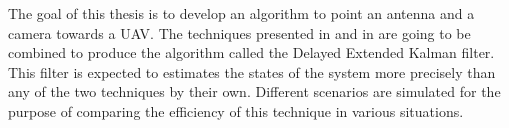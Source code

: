 %
%
%

\begin{publicabstract}

The goal of this thesis is to develop an algorithm to point an antenna and a camera towards a UAV. The techniques presented in \cite{Larsen1998} and in \cite{Beard2010a} are going to be combined to produce the algorithm called the Delayed Extended Kalman filter. This filter is expected to estimates the states of the system more precisely than any of the two techniques by their own. Different scenarios are simulated for the purpose of comparing the efficiency of this technique in various situations. 


\end{publicabstract}


